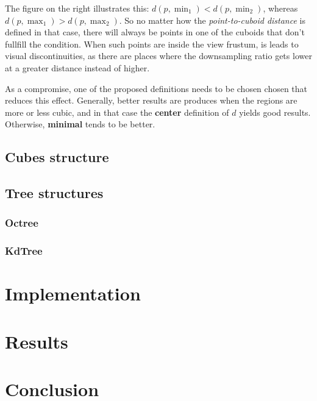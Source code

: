 \documentclass[a4paper,10pt,abstracton,notitlepage]{scrreprt}
\begin{document}
The figure on the right illustrates this: $d(p, \min_{1}) < d(p, \min_{2})$, whereas $d(p, \max_{1}) > d(p, \max_{2})$. So no matter how the \emph{point-to-cuboid distance} is defined in that case, there will always be points in one of the cuboids that don't fullfill the condition. When such points are inside the view frustum, is leads to visual discontinuities, as there are places where the downsampling ratio gets lower at a greater distance instead of higher.

As a compromise, one of the proposed definitions needs to be chosen chosen that reduces this effect. Generally, better results are produces when the regions are more or less cubic, and in that case the \textbf{center} definition of $d$ yields good results. Otherwise, \textbf{minimal} tends to be better.


 

\section{Cubes structure}
\section{Tree structures}
\subsection{Octree}
\subsection{KdTree}

\chapter{Implementation}

\chapter{Results}

\chapter{Conclusion}



\end{document}
